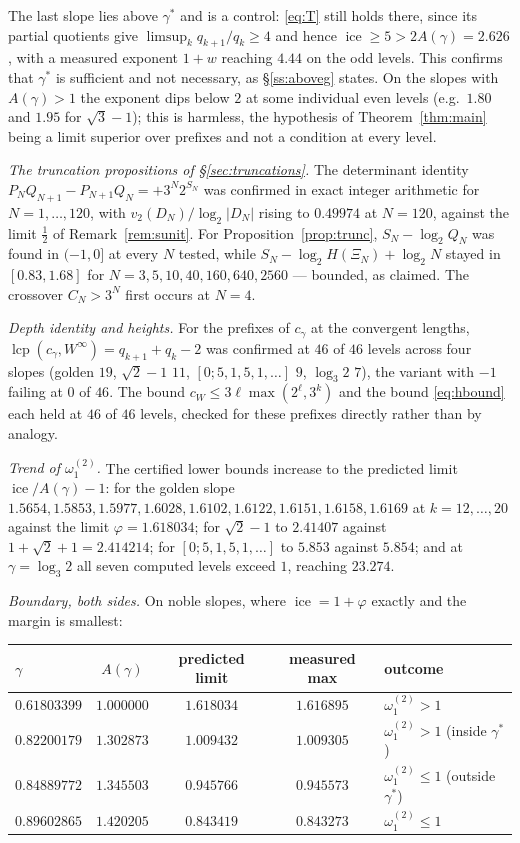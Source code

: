 \documentclass[11pt,reqno]{amsart}
\theoremstyle{plain}
\theoremstyle{definition}
\DeclareMathOperator{\lcp}{lcp}
\DeclareMathOperator{\ice}{ice}
\newcommand{\gs}{\gamma^{*}}
\newcommand{\Av}{A(\gamma)}
\newcommand{\om}{\omega_1^{(2)}}
\newcommand{\vtwo}{v_2}
\begin{document}
\noindent The last slope lies above $\gs$ and is a control: \eqref{eq:T} still holds there, since
its partial quotients give $\limsup_k q_{k+1}/q_k\ge4$ and hence $\ice\ge5>2\Av=2.626$, with a
measured exponent $1+w$ reaching $4.44$ on the odd levels. This confirms that $\gs$ is sufficient
and not necessary, as \S\ref{ss:aboveg} states. On the slopes with $\Av>1$ the exponent dips below
$2$ at some individual even levels (e.g.\ $1.80$ and $1.95$ for $\sqrt3-1$); this is harmless, the
hypothesis of Theorem~\ref{thm:main} being a limit superior over prefixes and not a condition at
every level.

\emph{The truncation propositions of \S\ref{sec:truncations}.} The determinant identity
$P_NQ_{N+1}-P_{N+1}Q_N=+3^{N}2^{S_N}$ was confirmed in exact integer arithmetic for
$N=1,\dots,120$, with $\vtwo(D_N)/\log_2|D_N|$ rising to $0.49974$ at $N=120$, against the limit
$\frac12$ of Remark~\ref{rem:sunit}. For Proposition~\ref{prop:trunc}, $S_N-\log_2 Q_N$ was found in
$(-1,0]$ at every $N$ tested, while $S_N-\log_2 H(\Xi_N)+\log_2 N$ stayed in $[0.83,1.68]$ for
$N=3,5,10,40,160,640,2560$ --- bounded, as claimed. The crossover $C_N>3^{N}$ first occurs at $N=4$.

\emph{Depth identity and heights.} For the prefixes of $c_\gamma$ at the convergent lengths,
$\lcp(c_\gamma,W^{\infty})=q_{k+1}+q_k-2$ was confirmed at $46$ of $46$ levels across four slopes
(golden $19$, $\sqrt2-1$ $11$, $[0;5,1,5,1,\dots]$ $9$, $\log_3 2$ $7$), the variant with $-1$
failing at $0$ of $46$. The bound $c_W\le3\ell\max(2^{\ell},3^{k})$ and the bound \eqref{eq:hbound}
each held at $46$ of $46$ levels, checked for these prefixes directly rather than by analogy.

\emph{Trend of $\om$.} The certified lower bounds increase to the predicted limit
$\ice/\Av-1$: for the golden slope $1.5654,1.5853,1.5977,1.6028,1.6102,1.6122,1.6151,1.6158,1.6169$
at $k=12,\dots,20$ against the limit $\varphi=1.618034$; for $\sqrt2-1$ to $2.41407$ against
$1+\sqrt2+1=2.414214$; for $[0;5,1,5,1,\dots]$ to $5.853$ against $5.854$; and at $\gamma=\log_3 2$
all seven computed levels exceed $1$, reaching $23.274$.

\emph{Boundary, both sides.} On noble slopes, where $\ice=1+\varphi$ exactly and the margin is
smallest:
\begin{center}
\begin{tabular}{lcccl}
\toprule
$\gamma$ & $\Av$ & predicted limit & measured max & outcome \\
\midrule
$0.61803399$ & $1.000000$ & $1.618034$ & $1.616895$ & $\om>1$ \\
$0.82200179$ & $1.302873$ & $1.009432$ & $1.009305$ & $\om>1$ (inside $\gs$) \\
$0.84889772$ & $1.345503$ & $0.945766$ & $0.945573$ & $\om\le1$ (outside $\gs$) \\
$0.89602865$ & $1.420205$ & $0.843419$ & $0.843273$ & $\om\le1$ \\
\bottomrule
\end{tabular}
\end{center}
\end{document}
